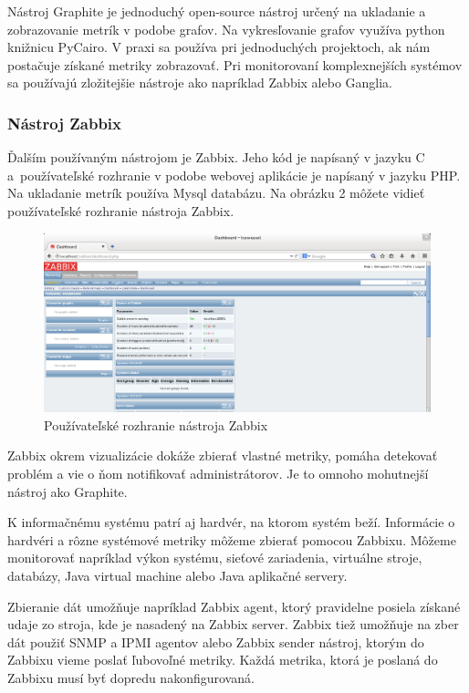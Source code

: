 \documentclass[a4paper, usesections, upjsfrontpage, disablespecwarning, thesismargins, thesislinespacing]{rnthesissvk}
\begin{document}
Nástroj Graphite je jednoduchý open-source nástroj určený na ukladanie a zobrazovanie metrík v podobe grafov.
Na vykresľovanie grafov využíva python knižnicu PyCairo.
V praxi sa používa pri jednoduchých projektoch, ak nám postačuje získané metriky zobrazovať.
Pri monitorovaní komplexnejších systémov sa používajú zložitejšie nástroje ako napríklad Zabbix alebo Ganglia.

\subsubsection{Nástroj Zabbix}

\noindent
Ďalším používaným nástrojom je Zabbix.
Jeho kód je napísaný v jazyku C a~používateľské rozhranie v podobe webovej aplikácie je napísaný v jazyku PHP.
Na ukladanie metrík používa Mysql databázu.
Na obrázku 2 môžete vidieť používateľské rozhranie nástroja Zabbix.

\begin{figure}
\begin{center}
\includegraphics[scale=0.41]{zabbix.png}
\end{center}
\caption{Používateľské rozhranie nástroja Zabbix}
\end{figure}

Zabbix okrem vizualizácie dokáže zbierať vlastné metriky, pomáha detekovať problém a vie o ňom notifikovať administrátorov.
Je to omnoho mohutnejší nástroj ako Graphite.

K informačnému systému patrí aj hardvér, na ktorom systém beží.
Informácie o hardvéri a rôzne systémové metriky môžeme zbierať pomocou Zabbixu.
Môžeme monitorovať napríklad výkon systému, sieťové zariadenia, virtuálne stroje, databázy, Java virtual machine alebo Java aplikačné servery.

Zbieranie dát umožňuje napríklad Zabbix agent, ktorý pravidelne posiela získané udaje zo stroja, kde je nasadený na Zabbix server.
Zabbix tiež umožňuje na zber dát použiť SNMP a IPMI agentov alebo Zabbix sender nástroj, ktorým do Zabbixu vieme poslať ľubovoľné metriky.
Každá metrika, ktorá je poslaná do Zabbixu musí byť dopredu nakonfigurovaná.
\end{document}
